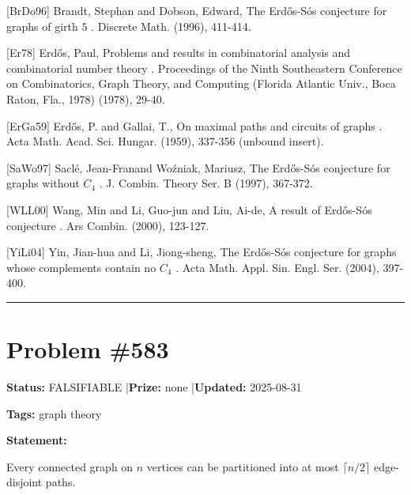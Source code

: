 \documentclass{article}
\begin{document}
[BrDo96] Brandt, Stephan and Dobson, Edward, The Erd\H{o}s-S\'{o}s conjecture for graphs of girth {$5$} . Discrete Math. (1996), 411-414.

[Er78] Erd\H{o}s, Paul, Problems and results in combinatorial analysis and combinatorial number theory . Proceedings of the Ninth Southeastern Conference on Combinatorics, Graph Theory, and Computing (Florida Atlantic Univ., Boca Raton, Fla., 1978) (1978), 29-40.

[ErGa59] Erd\H{o}s, P. and Gallai, T., On maximal paths and circuits of graphs . Acta Math. Acad. Sci. Hungar. (1959), 337-356 (unbound insert).

[SaWo97] Sacl\'{e}, Jean-Fran\cCois and Wo\'{z}niak, Mariusz, The Erd\H{o}s-S\'{o}s conjecture for graphs without {$C_4$} . J. Combin. Theory Ser. B (1997), 367-372.

[WLL00] Wang, Min and Li, Guo-jun and Liu, Ai-de, A result of Erd\H{o}s-S\'{o}s conjecture . Ars Combin. (2000), 123-127.

[YiLi04] Yin, Jian-hua and Li, Jiong-sheng, The Erd\H{o}s-S\'{o}s conjecture for graphs whose complements contain no {$C_4$} . Acta Math. Appl. Sin. Engl. Ser. (2004), 397-400.

\noindent\rule{\linewidth}{0.4pt}


\section{Problem \#583}
\label{prob:583}

\noindent\textbf{Status:} FALSIFIABLE \quad|\quad \textbf{Prize:} none \quad|\quad \textbf{Updated:} 2025-08-31

\noindent\textbf{Tags:} graph theory

\medskip

\noindent\textbf{Statement:}

Every connected graph on $n$ vertices can be partitioned into at most $\lceil n/2\rceil$ edge-disjoint paths.
\end{document}
